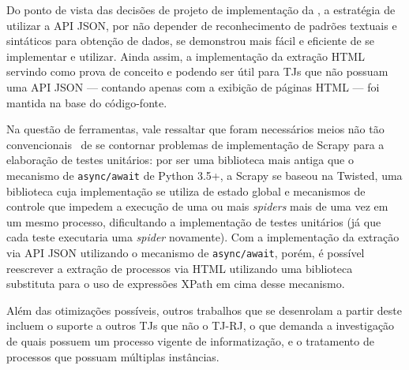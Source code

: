 Do ponto de vista das decisões de projeto de implementação da \tjscraper, a
estratégia de utilizar a API JSON, por não depender de reconhecimento de padrões
textuais e sintáticos para obtenção de dados, se demonstrou mais fácil e
eficiente de se implementar e utilizar. Ainda assim, a implementação da
extração HTML servindo como prova de conceito e podendo ser útil para TJs que
não possuam uma API JSON --- contando apenas com a exibição de páginas HTML ---
foi mantida na base do código-fonte.

Na questão de ferramentas, vale ressaltar que foram necessários meios não tão
convencionais~\cite{tjscraper:commit-scrapy-run-spider} de se contornar
problemas de implementação de Scrapy para a elaboração de testes unitários: por
ser uma biblioteca mais antiga que o mecanismo de \texttt{async/await} de
Python 3.5+, a Scrapy se baseou na Twisted, uma biblioteca cuja implementação
se utiliza de estado global e mecanismos de controle que impedem a execução de
uma ou mais \textit{spiders} mais de uma vez em um mesmo processo, dificultando
a implementação de testes unitários (já que cada teste executaria uma
\textit{spider} novamente). Com a implementação da extração via API JSON
utilizando o mecanismo de \texttt{async/await}, porém, é possível reescrever a
extração de processos via HTML utilizando uma biblioteca substituta para o uso
de expressões XPath em cima desse mecanismo.

Além das otimizações possíveis, outros trabalhos que se desenrolam a partir
deste incluem o suporte a outros TJs que não o TJ-RJ, o que demanda a
investigação de quais possuem um processo vigente de informatização, e o
tratamento de processos que possuam múltiplas instâncias.

